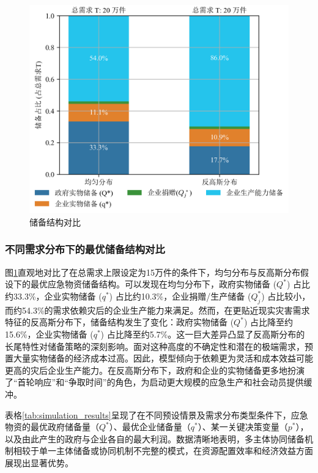 \documentclass[a4paper,8pt,twocolumn]{article} %
\begin{document}
\begin{figure}[H]
    \centering
    \includegraphics[width=\linewidth]{basic_pictures/储备结构对比.png}
    \caption{储备结构对比}
    \label{fig:structure_comparison}
\end{figure}

\subsubsection{不同需求分布下的最优储备结构对比}
图\ref{fig:structure_comparison}直观地对比了在总需求上限设定为15万件的条件下，均匀分布与反高斯分布假设下的最优应急物资储备结构。可以发现在均匀分布下，政府实物储备 ($Q^*$) 占比约33.3\%，企业实物储备 ($q^*$) 占比约10.3\%，企业捐赠/生产储备 ($Q_j^*$) 占比较小，而约54.3\%的需求依赖灾后的企业生产能力来满足。然而，在更贴近现实灾害需求特征的反高斯分布下，储备结构发生了变化：政府实物储备 ($Q^*$) 占比降至约15.6\%，企业实物储备 ($q^*$) 占比降至约5.7\%。这一巨大差异凸显了反高斯分布的长尾特性对储备策略的深刻影响。面对这种高度的不确定性和潜在的极端需求，预置大量实物储备的经济成本过高。因此，模型倾向于依赖更为灵活和成本效益可能更高的灾后企业生产能力。在反高斯分布下，政府和企业的实物储备更多地扮演了“首轮响应”和“争取时间”的角色，为启动更大规模的应急生产和社会动员提供缓冲。

表格\ref{tab:simulation_results}呈现了在不同预设情景及需求分布类型条件下，应急物资的最优政府储备量（$Q^*$）、最优企业储备量（$q^*$）、某一关键决策变量（$p^*$），以及由此产生的政府与企业各自的最大利润。数据清晰地表明，多主体协同储备机制相较于单一主体储备或协同机制不完整的模式，在资源配置效率和经济效益方面展现出显著优势。
\end{document}

